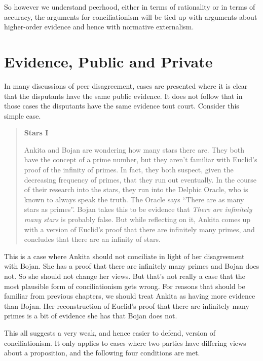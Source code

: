 So however we understand peerhood, either in terms of rationality or in terms of accuracy, the arguments for conciliationism will be tied up with arguments about higher-order evidence and hence with normative externalism.

\section{Evidence, Public and Private}
\label{evidencepublicandprivate}

In many discussions of peer disagreement, cases are presented where it is clear that the disputants have the same public evidence. It does not follow that in those cases the disputants have the same evidence tout court. Consider this simple case.

\begin{quote}
\textbf{Stars I}

\gls{Ankita} and \gls{Bojan} are wondering how many stars there are. They both have the concept of a prime number, but they aren't familiar with Euclid's proof of the infinity of primes. In fact, they both suspect, given the decreasing frequency of primes, that they run out eventually. In the course of their research into the stars, they run into the Delphic Oracle, who is known to always speak the truth. The Oracle says ``There are as many stars as primes''. \gls{Bojan} takes this to be evidence that \emph{There are infinitely many stars} is probably false. But while reflecting on it, \gls{Ankita} comes up with a version of Euclid's proof that there are infinitely many primes, and concludes that there are an infinity of stars.
\end{quote}
This is a case where \gls{Ankita} should not conciliate in light of her disagreement with \gls{Bojan}. She has a proof that there are infinitely many primes and \gls{Bojan} does not. So she should not change her views. But that's not really a case that the most plausible form of conciliationism gets wrong. For reasons that should be familiar from previous chapters, we should treat \gls{Ankita} as having more evidence than \gls{Bojan}. Her reconstruction of Euclid's proof that there are infinitely many primes is a bit of evidence she has that \gls{Bojan} does not.

This all suggests a very weak, and hence easier to defend, version of conciliationism. It only applies to cases where two parties have differing views about a proposition, and the following four conditions are met.

